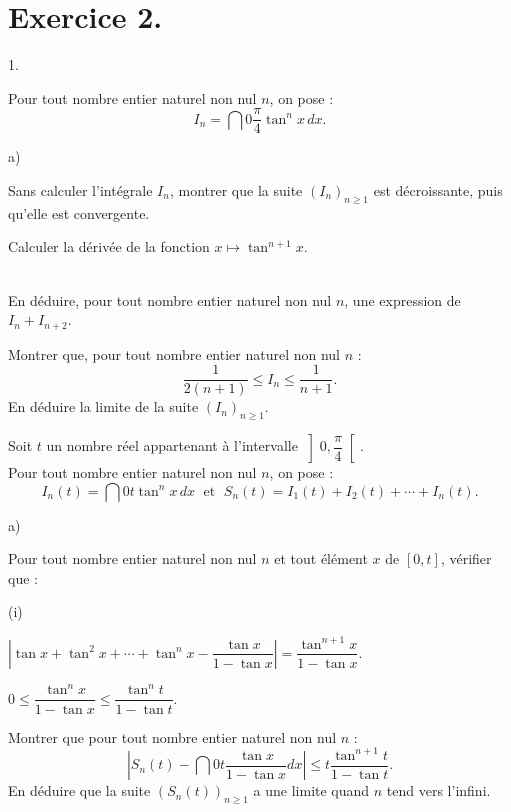 \documentclass[11pt]{article}%
\begin{document}
\section*{Exercice 2.}

\begin{noliste}{1.}
 \setlength{\itemsep}{4mm}
\item Pour tout nombre entier naturel non nul $n$, on pose : 
\[
I_{n} = \dint{0}{\dfrac{\pi }{4}}\tan ^{n}x\,dx.
\]

\begin{noliste}{a)}
 \setlength{\itemsep}{2mm}
\item Sans calculer l'intégrale $I_{n}$, montrer que la suite
$(I_{n})_{n\geq 1}$ est décroissante, puis qu'elle est convergente.

\item Calculer la dérivée de la fonction $x\longmapsto \tan ^{n + 1}x$.

\\
En déduire, pour tout nombre entier naturel non nul $n$, une expression
de $I_{n} + I_{n + 2}$.

\item Montrer que, pour tout nombre entier naturel non nul $n$ : 
\[
\frac{1}{2(n + 1)}\leq I_{n}\leq \frac{1}{n + 1}.
\]
En déduire la limite de la suite $(I_{n})_{n\geq 1}$.
\end{noliste}

\item Soit $t$ un nombre réel appartenant à l'intervalle $\left]
0,\dfrac{\pi }{4}\right[ $. \\
Pour tout nombre entier naturel non nul $n$, on pose : 
\[
I_{n}(t) = \dint{0}{t}\tan ^{n}x\,dx\;\text{ et }\;S_{n}(t) = I_{1}(t)
+ I_{2}(t) + \cdots + I_{n}(t).
\]

\begin{noliste}{a)}
 \setlength{\itemsep}{2mm}
\item Pour tout nombre entier naturel non nul $n$ et tout élément $x$
de $[0,t]$, vérifier que :

\begin{nonoliste}{(i)}
\item $\left| \tan x + \tan ^{2}x + \cdots + \tan ^{n}x-\dfrac{\tan
x}{1-\tan
x}\right| = \dfrac{\tan ^{n + 1}x}{1-\tan x}$.

\item $0\leq \dfrac{\tan ^{n}x}{1-\tan x}\leq \dfrac{\tan ^{n}t}{1-\tan
t}$.
\end{nonoliste}

\item Montrer que pour tout nombre entier naturel non nul $n$ : 
\[
\left| S_{n}(t)-\dint{0}{t}\frac{\tan x}{1-\tan x}dx\right|
\leq t\frac{\tan ^{n + 1}t}{1-\tan t}.
\]
En déduire que la suite $(S_{n}(t))_{n\geq 1}$ a une limite quand $n$
tend vers l'infini.


\end{noliste}
\end{noliste}
\end{document}

